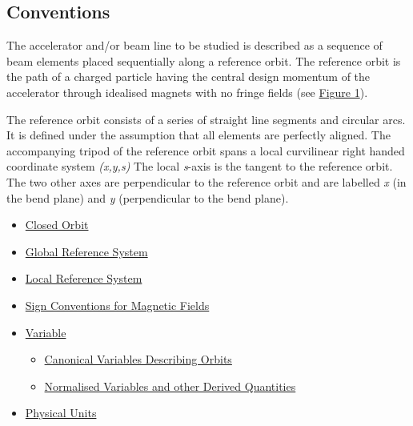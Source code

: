 




\subsection{Conventions}

 The accelerator and/or beam line to be studied is described as a sequence of beam elements placed sequentially along a reference orbit. The reference orbit is the path of a charged particle having the central design momentum of the accelerator through idealised magnets with no fringe fields (see \hyperlink{local}{Figure 1}). 

 The reference orbit consists of a series of straight line segments and circular arcs. It is defined under the assumption that all elements are perfectly aligned. The accompanying tripod of the reference orbit spans a local curvilinear right handed coordinate system \textit{(x,y,s)} The local \textit{s}-axis is the tangent to the reference orbit. The two other axes are perpendicular to the reference orbit and are labelled \textit{x} (in the bend plane) and \textit{y} (perpendicular to the bend plane). 
\begin{itemize}
	\item \href{closed_orbit.html}{Closed Orbit}
	\item \href{global_system.html}{Global Reference System}
	\item \href{local_system.html}{Local Reference System}
	\item \href{sign_convent.html}{Sign Conventions for Magnetic Fields}
	\item \href{tables.html}{Variable}
\begin{itemize}
	\item \href{tables.html#canon}{Canonical Variables Describing Orbits}
	\item \href{tables.html#normal}{Normalised Variables and other Derived Quantities}
\end{itemize}
	\item \href{mad_units.html}{Physical Units}
\end{itemize}

